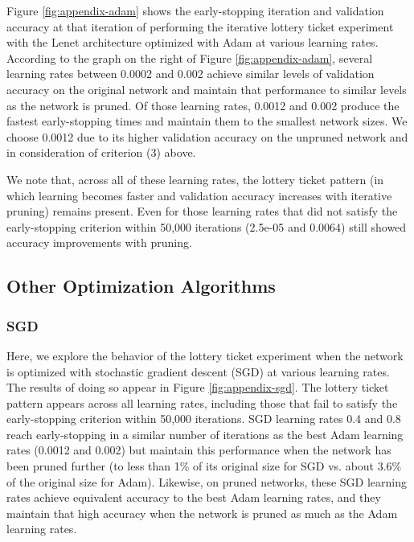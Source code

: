 Figure \ref{fig:appendix-adam} shows the early-stopping iteration and validation accuracy at that iteration of performing the iterative lottery ticket
experiment with the Lenet architecture optimized with Adam at various learning rates. According to the graph on 
the right of Figure \ref{fig:appendix-adam}, several learning rates between 0.0002 and 0.002 achieve
similar levels of validation accuracy on the original network and maintain that performance to similar levels as the network is pruned. Of those learning
rates, 0.0012 and 0.002 produce the fastest early-stopping times and maintain them to the smallest network sizes. We choose 0.0012 due to its higher validation accuracy
on the unpruned network and in consideration of criterion (3) above.

We note that, across all of these learning rates, the lottery ticket pattern (in which learning becomes faster and validation accuracy increases with iterative
pruning) remains present. Even for those learning rates that did not satisfy the early-stopping criterion within 50,000 iterations (2.5e-05 and 0.0064) still showed accuracy
improvements with pruning.

\subsection{Other Optimization Algorithms}

\subsubsection{SGD}

Here, we explore the behavior of the lottery ticket experiment when the network is optimized with stochastic gradient descent (SGD) at various learning rates.
The results of doing so appear in Figure \ref{fig:appendix-sgd}. The lottery ticket pattern appears across all learning rates, including those that fail to
satisfy the early-stopping criterion
within 50,000 iterations. SGD learning rates 0.4 and 0.8 reach early-stopping in a similar number of iterations as the best Adam learning rates
(0.0012 and 0.002) but maintain this performance when the network has been pruned further (to less than 1\% of its original size for SGD vs.
about 3.6\% of the original size for Adam). Likewise, on pruned networks, these SGD learning rates achieve equivalent  accuracy to
the best Adam learning rates,
and they maintain that high accuracy when the network is pruned as much as the Adam learning rates.

